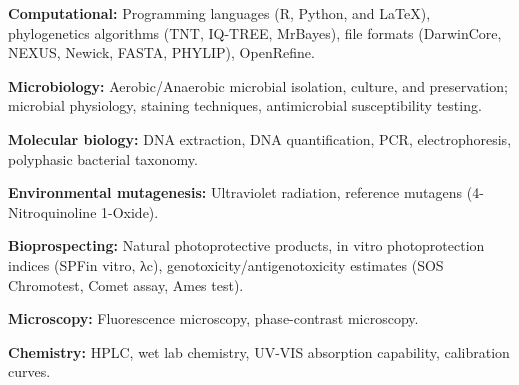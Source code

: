 {}
\begin{cventries}

\vspace{-0.4cm}
\cventry
{}
{}
{}
{}
{
\begin{cvitems} 
\item {\textbf{Computational:} Programming languages (R, Python, and LaTeX), phylogenetics algorithms (TNT, IQ-TREE, MrBayes), file formats (DarwinCore, NEXUS, Newick, FASTA, PHYLIP), OpenRefine.}
\item {\textbf{Microbiology:} Aerobic/Anaerobic microbial isolation, culture, and preservation; microbial physiology, staining techniques, antimicrobial susceptibility testing.}
\item {\textbf{Molecular biology:} DNA extraction, DNA quantification, PCR, electrophoresis, polyphasic bacterial taxonomy.}
\item {\textbf{Environmental mutagenesis:} Ultraviolet radiation, reference mutagens (4-Nitroquinoline 1-Oxide).}
\item {\textbf{Bioprospecting:} Natural photoprotective products, in vitro photoprotection indices (SPFin vitro, λc), genotoxicity/antigenotoxicity estimates (SOS Chromotest, Comet assay, Ames test).}
\item {\textbf{Microscopy:} Fluorescence microscopy, phase-contrast microscopy.}
\item {\textbf{Chemistry:} HPLC, wet lab chemistry, UV-VIS absorption capability, calibration curves.}
\end{cvitems}
}
\vspace{-0.2cm}

\end{cventries}
